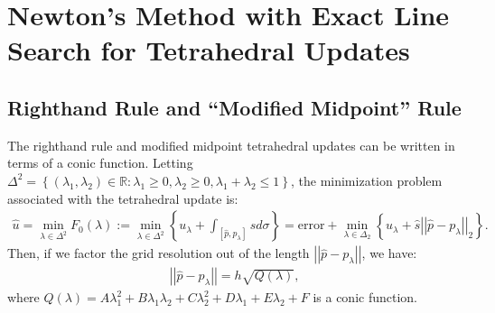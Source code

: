 \documentclass{article}
\newcommand{\curlyb}[1]{\left\{#1\right\}}
\newcommand{\R}{\mathbb{R}}
\newcommand{\norm}[1]{\left|\left|#1\right|\right|}
\newcommand{\set}[1]{\left\{#1\right\}}
\begin{document}
\section{Newton's Method with Exact Line Search for Tetrahedral Updates}

\subsection{Righthand Rule and ``Modified Midpoint'' Rule}

The righthand rule and modified midpoint tetrahedral updates can be
written in terms of a conic function. Letting
$\Delta^2 = \set{(\lambda_1, \lambda_2) \in \R : \lambda_1 \geq 0,
  \lambda_2 \geq 0, \lambda_1 + \lambda_2 \leq 1}$, the minimization
problem associated with the tetrahedral update is:
\begin{align*}
  \hat{u} = \min_{\lambda \in \Delta^2} F_0(\lambda) := \min_{\lambda \in \Delta^2} \curlyb{u_\lambda + \int_{[\hat{p}, p_\lambda]} s d\sigma} = \mbox{error} + \min_{\lambda \in \Delta_2} \curlyb{u_\lambda + \hat{s} \norm{\hat{p} - p_\lambda}_2}.
\end{align*}
Then, if we factor the grid resolution out of the length
$\norm{\hat{p} - p_\lambda}$, we have:
\begin{align*}
  \norm{\hat{p} - p_\lambda} = h \sqrt{Q(\lambda)},
\end{align*}
where
$Q(\lambda) = A\lambda_1^2 + B\lambda_1\lambda_2 + C\lambda_2^2 +
D\lambda_1 + E\lambda_2 + F$ is a conic function.
\end{document}
